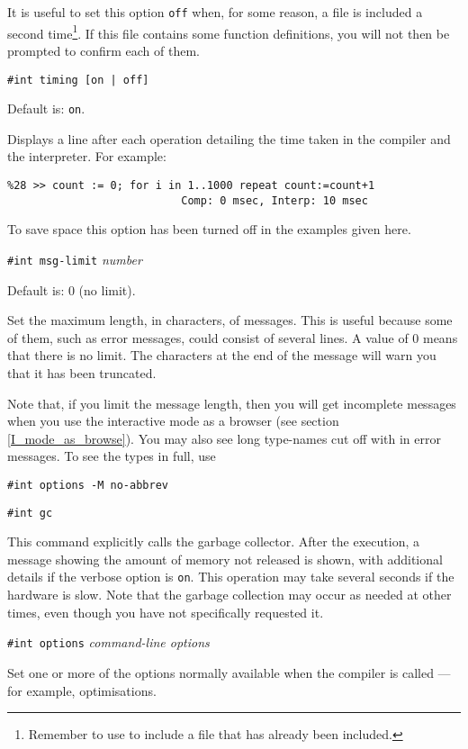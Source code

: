 It is useful to set this option \verb"off" when, for some reason, a file
is included a second time\footnote{Remember to use  to
include a file that has already been included.}. If this file contains
some function definitions, you will not then be prompted to confirm each
of them.

\mysubsect{} \verb"#int timing [on | off]"

Default is: \verb+on+.

Displays a line after each operation detailing the time taken in the
compiler and the interpreter.  For example:
\begin{small}
\begin{verbatim}
%28 >> count := 0; for i in 1..1000 repeat count:=count+1
                           Comp: 0 msec, Interp: 10 msec
\end{verbatim}
\end{small}
To save space this option has been turned off in the examples given here.

\mysubsect{} \verb"#int msg-limit" {\it number}

Default is: 0 (no limit).

Set the maximum length, in characters, of \asharp{} messages. This is
useful because some of them, such as error messages, could consist of
several lines.  A value of 0 means that there is no limit. The
characters  at the end of the message will warn you that it
has been truncated.

Note that, if you limit the message length, then you will get
incomplete messages when you use the interactive mode as a
browser (see section \ref{I_mode_as_browse}).
You may also see long type-names cut off with  in error
messages.
To see the types in full, use 
\begin{verbatim}
#int options -M no-abbrev
\end{verbatim}

\mysubsect{} \verb"#int gc"

This command explicitly calls the garbage collector. 
After the execution, a message showing the amount of memory not released
is shown, with additional details if the verbose option is \verb"on".
This operation may take several seconds if the hardware is slow. 
Note that the garbage collection may occur as needed at other times,
even though you have not specifically requested it.

\mysubsect{} \verb"#int options" {\it command-line options}


Set one or more of the options normally available when the compiler is
called --- for example, optimisations.

